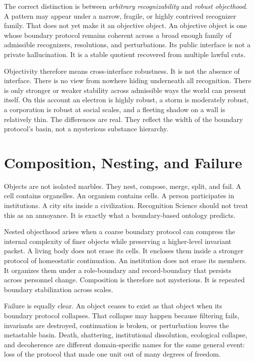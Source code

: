 \documentclass[11pt]{article}
\begin{document}
The correct distinction is between \emph{arbitrary recognizability} and \emph{robust objecthood}.
A pattern may appear under a narrow, fragile, or highly contrived recognizer family.
That does not yet make it an objective object.
An objective object is one whose boundary protocol remains coherent across a broad enough family of admissible recognizers, resolutions, and perturbations.
Its public interface is not a private hallucination.
It is a stable quotient recovered from multiple lawful cuts.

Objectivity therefore means cross-interface robustness.
It is not the absence of interface.
There is no view from nowhere hiding underneath all recognition.
There is only stronger or weaker stability across admissible ways the world can present itself.
On this account an electron is highly robust, a storm is moderately robust, a corporation is robust at social scales, and a fleeting shadow on a wall is relatively thin.
The differences are real.
They reflect the width of the boundary protocol's basin, not a mysterious substance hierarchy.

\section{Composition, Nesting, and Failure}

Objects are not isolated marbles.
They nest, compose, merge, split, and fail.
A cell contains organelles.
An organism contains cells.
A person participates in institutions.
A city sits inside a civilization.
Recognition Science should not treat this as an annoyance.
It is exactly what a boundary-based ontology predicts.

Nested objecthood arises when a coarse boundary protocol can compress the internal complexity of finer objects while preserving a higher-level invariant packet.
A living body does not erase its cells.
It encloses them inside a stronger protocol of homeostatic continuation.
An institution does not erase its members.
It organizes them under a role-boundary and record-boundary that persists across personnel change.
Composition is therefore not mysterious.
It is repeated boundary stabilization across scales.

Failure is equally clear.
An object ceases to exist as that object when its boundary protocol collapses.
That collapse may happen because filtering fails, invariants are destroyed, continuation is broken, or perturbation leaves the metastable basin.
Death, shattering, institutional dissolution, ecological collapse, and decoherence are different domain-specific names for the same general event: loss of the protocol that made one unit out of many degrees of freedom.
\end{document}
